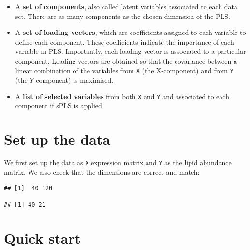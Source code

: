 \documentclass[]{book}
\newenvironment{Shaded}{\begin{snugshade}}{\end{snugshade}}
\newcommand{\KeywordTok}[1]{\textcolor[rgb]{0.13,0.29,0.53}{\textbf{#1}}}
\newcommand{\NormalTok}[1]{#1}
\newcommand{\OperatorTok}[1]{\textcolor[rgb]{0.81,0.36,0.00}{\textbf{#1}}}
\newcommand{\StringTok}[1]{\textcolor[rgb]{0.31,0.60,0.02}{#1}}
\begin{document}
\begin{itemize}
\item
  A \textbf{set of components}, also called latent variables associated to each data set. There are as many components as the chosen dimension of the PLS.
\item
  A \textbf{set of loading vectors}, which are coefficients assigned to each variable to define each component. These coefficients indicate the importance of each variable in PLS. Importantly, each loading vector is associated to a particular component. Loading vectors are obtained so that the covariance between a linear combination of the variables from \texttt{X} (the X-component) and from \texttt{Y} (the \(Y\)-component) is maximised.
\item
  A \textbf{list of selected variables} from both \texttt{X} and \texttt{Y} and associated to each component if sPLS is applied.
\end{itemize}

\hypertarget{set-up-the-data-1}{%
\section{Set up the data}\label{set-up-the-data-1}}

We first set up the data as \texttt{X} expression matrix and \texttt{Y} as the lipid abundance matrix. We also check that the dimensions are correct and match:

\begin{Shaded}
\end{Shaded}

\begin{verbatim}
## [1]  40 120
\end{verbatim}

\begin{verbatim}
## [1] 40 21
\end{verbatim}

\hypertarget{quick-start-2}{%
\section{Quick start}\label{quick-start-2}}
\end{document}
